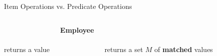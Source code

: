 
\begin{frame}{Item Operations vs. Predicate Operations}
  \begin{columns}[c,onlytextwidth]
      \begin{center}
        \\[1.0em]
        \\[0.2em]
        {returns a value}
      \end{center}
      \begin{center}
        \large\textbf{Employee}\\[.45em]
        
      \end{center}
    \begin{center}
      \\[1.0em]
      \\[0.2em]
      {returns a set $M$ of {\bf matched} values}
    \end{center}
  \end{columns}
\end{frame}